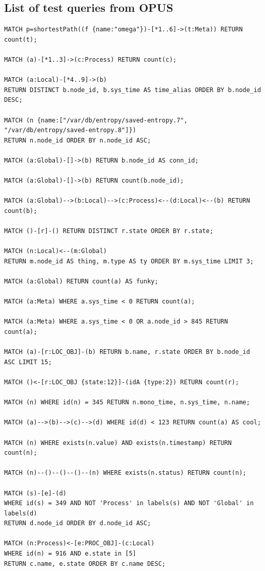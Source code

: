 \documentclass[letterpaper]{ltxdoc}
\begin{document}
\subsection{List of test queries from OPUS}
\begin{verbatim}
MATCH p=shortestPath((f {name:"omega"})-[*1..6]->(t:Meta)) RETURN count(t);

MATCH (a)-[*1..3]->(c:Process) RETURN count(c);

MATCH (a:Local)-[*4..9]->(b)
RETURN DISTINCT b.node_id, b.sys_time AS time_alias ORDER BY b.node_id DESC;

MATCH (n {name:["/var/db/entropy/saved-entropy.7", "/var/db/entropy/saved-entropy.8"]})
RETURN n.node_id ORDER BY n.node_id ASC;

MATCH (a:Global)-[]->(b) RETURN b.node_id AS conn_id;

MATCH (a:Global)-[]->(b) RETURN count(b.node_id);

MATCH (a:Global)-->(b:Local)-->(c:Process)<--(d:Local)<--(b) RETURN count(b);

MATCH ()-[r]-() RETURN DISTINCT r.state ORDER BY r.state;

MATCH (n:Local)<--(m:Global)
RETURN m.node_id AS thing, m.type AS ty ORDER BY m.sys_time LIMIT 3;

MATCH (a:Global) RETURN count(a) AS funky;

MATCH (a:Meta) WHERE a.sys_time < 0 RETURN count(a);

MATCH (a:Meta) WHERE a.sys_time < 0 OR a.node_id > 845 RETURN count(a);

MATCH (a)-[r:LOC_OBJ]-(b) RETURN b.name, r.state ORDER BY b.node_id ASC LIMIT 15;

MATCH ()<-[r:LOC_OBJ {state:12}]-(idA {type:2}) RETURN count(r);

MATCH (n) WHERE id(n) = 345 RETURN n.mono_time, n.sys_time, n.name;

MATCH (a)-->(b)-->(c)-->(d) WHERE id(d) < 123 RETURN count(a) AS cool;

MATCH (n) WHERE exists(n.value) AND exists(n.timestamp) RETURN count(n);

MATCH (n)--()--()--()--(n) WHERE exists(n.status) RETURN count(n);

MATCH (s)-[e]-(d)
WHERE id(s) = 349 AND NOT 'Process' in labels(s) AND NOT 'Global' in labels(d)
RETURN d.node_id ORDER BY d.node_id ASC;

MATCH (n:Process)<-[e:PROC_OBJ]-(c:Local)
WHERE id(n) = 916 AND e.state in [5]
RETURN c.name, e.state ORDER BY c.name DESC;


\end{verbatim}
\end{document}
